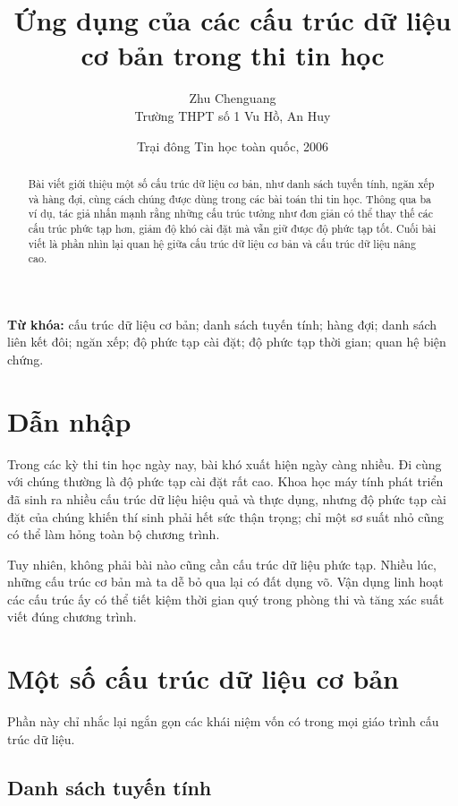 \documentclass[11pt]{article}
\title{Ứng dụng của các cấu trúc dữ liệu cơ bản trong thi tin học}
\author{Zhu Chenguang\\Trường THPT số 1 Vu Hồ, An Huy}
\date{Trại đông Tin học toàn quốc, 2006}
\begin{document}
\maketitle


\renewcommand{\abstractname}{Tóm tắt}
\begin{abstract}
Bài viết giới thiệu một số cấu trúc dữ liệu cơ bản, như danh sách tuyến tính,
ngăn xếp và hàng đợi, cùng cách chúng được dùng trong các bài toán thi tin học.
Thông qua ba ví dụ, tác giả nhấn mạnh rằng những cấu trúc tưởng như đơn giản
có thể thay thế các cấu trúc phức tạp hơn, giảm độ khó cài đặt mà vẫn giữ được
độ phức tạp tốt. Cuối bài viết là phần nhìn lại quan hệ giữa cấu trúc dữ liệu
cơ bản và cấu trúc dữ liệu nâng cao.
\end{abstract}

\noindent\textbf{Từ khóa:} cấu trúc dữ liệu cơ bản; danh sách tuyến tính;
hàng đợi; danh sách liên kết đôi; ngăn xếp; độ phức tạp cài đặt; độ phức tạp
thời gian; quan hệ biện chứng.

\section{Dẫn nhập}

Trong các kỳ thi tin học ngày nay, bài khó xuất hiện ngày càng nhiều. Đi cùng
với chúng thường là độ phức tạp cài đặt rất cao. Khoa học máy tính phát triển
đã sinh ra nhiều cấu trúc dữ liệu hiệu quả và thực dụng, nhưng độ phức tạp
cài đặt của chúng khiến thí sinh phải hết sức thận trọng; chỉ một sơ suất nhỏ
cũng có thể làm hỏng toàn bộ chương trình.

Tuy nhiên, không phải bài nào cũng cần cấu trúc dữ liệu phức tạp. Nhiều lúc,
những cấu trúc cơ bản mà ta dễ bỏ qua lại có đất dụng võ. Vận dụng linh hoạt
các cấu trúc ấy có thể tiết kiệm thời gian quý trong phòng thi và tăng xác
suất viết đúng chương trình.

\section{Một số cấu trúc dữ liệu cơ bản}

Phần này chỉ nhắc lại ngắn gọn các khái niệm vốn có trong mọi giáo trình cấu
trúc dữ liệu.

\subsection{Danh sách tuyến tính}
\end{document}
